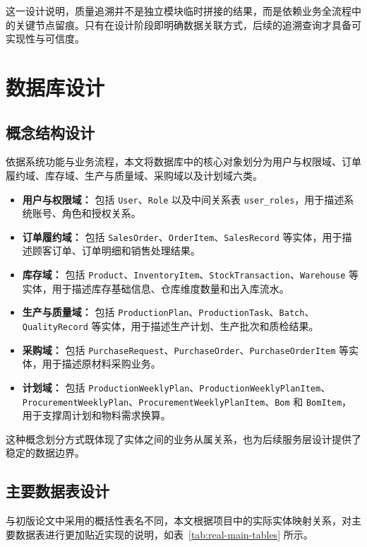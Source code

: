 这一设计说明，质量追溯并不是独立模块临时拼接的结果，而是依赖业务全流程中的关键节点留痕。只有在设计阶段即明确数据关联方式，后续的追溯查询才具备可实现性与可信度。

\section{数据库设计}

\subsection{概念结构设计}

依据系统功能与业务流程，本文将数据库中的核心对象划分为用户与权限域、订单履约域、库存域、生产与质量域、采购域以及计划域六类。

\begin{itemize}
  \item \textbf{用户与权限域：} 包括 \texttt{User}、\texttt{Role} 以及中间关系表 \texttt{user\_roles}，用于描述系统账号、角色和授权关系。
  \item \textbf{订单履约域：} 包括 \texttt{SalesOrder}、\texttt{OrderItem}、\texttt{SalesRecord} 等实体，用于描述顾客订单、订单明细和销售处理结果。
  \item \textbf{库存域：} 包括 \texttt{Product}、\texttt{InventoryItem}、\texttt{StockTransaction}、\texttt{Warehouse} 等实体，用于描述库存基础信息、仓库维度数量和出入库流水。
  \item \textbf{生产与质量域：} 包括 \texttt{ProductionPlan}、\texttt{ProductionTask}、\texttt{Batch}、\texttt{QualityRecord} 等实体，用于描述生产计划、生产批次和质检结果。
  \item \textbf{采购域：} 包括 \texttt{PurchaseRequest}、\texttt{PurchaseOrder}、\texttt{PurchaseOrderItem} 等实体，用于描述原材料采购业务。
  \item \textbf{计划域：} 包括 \texttt{ProductionWeeklyPlan}、\texttt{ProductionWeeklyPlanItem}、\texttt{ProcurementWeeklyPlan}、\texttt{ProcurementWeeklyPlanItem}、\texttt{Bom} 和 \texttt{BomItem}，用于支撑周计划和物料需求换算。
\end{itemize}

这种概念划分方式既体现了实体之间的业务从属关系，也为后续服务层设计提供了稳定的数据边界。

\subsection{主要数据表设计}

与初版论文中采用的概括性表名不同，本文根据项目中的实际实体映射关系，对主要数据表进行更加贴近实现的说明，如表~\ref{tab:real-main-tables} 所示。

